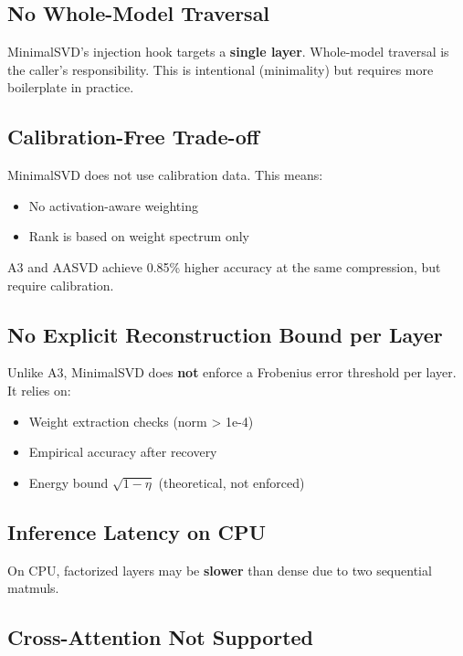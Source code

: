 \subsection{No Whole-Model Traversal}

MinimalSVD's injection hook targets a \textbf{single layer}. Whole-model 
traversal is the caller's responsibility. This is intentional (minimality) 
but requires more boilerplate in practice.

\subsection{Calibration-Free Trade-off}

MinimalSVD does not use calibration data. This means:
\begin{itemize}
\item No activation-aware weighting
\item Rank is based on weight spectrum only

\end{itemize}
A3 and AASVD achieve 0.85\% higher accuracy at the same compression, 
but require calibration.

\subsection{No Explicit Reconstruction Bound per Layer}

Unlike A3, MinimalSVD does \textbf{not} enforce a Frobenius error threshold per 
layer. It relies on:
\begin{itemize}
\item Weight extraction checks (norm \textgreater{} 1e-4)
\item Empirical accuracy after recovery
\item Energy bound $\sqrt{1 - \eta}$ (theoretical, not enforced)

\end{itemize}
\subsection{Inference Latency on CPU}

On CPU, factorized layers may be \textbf{slower} than dense due to two sequential 
matmuls.

\subsection{Cross-Attention Not Supported}

